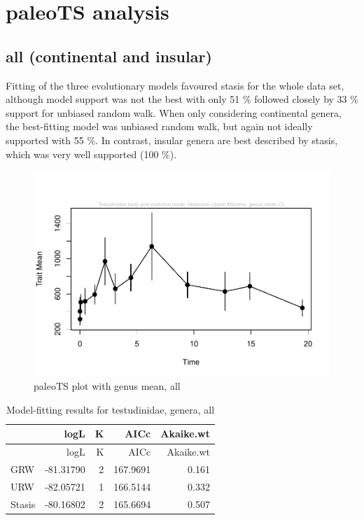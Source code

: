 \FloatBarrier

\section{paleoTS analysis}\label{paleots-analysis}




\subsection{all (continental and
	insular)}\label{all-continental-and-insular}

Fitting of the three evolutionary models favoured stasis for the whole data set, although model support was not the best with only 51 \% followed closely by 33 \% support for unbiased random walk. When only considering continental genera, the best-fitting model was unbiased random walk, but again not ideally supported with 55 \%. In contrast, insular genera are best described by stasis, which was very well supported (100 \%). 


\begin{figure}[H]
	\centering
	\includegraphics{MA_JJ_files/figure-latex/paleoTSAll-1.pdf}
	\caption{paleoTS plot with genus mean, all}
	\label{fig:pTSall}
\end{figure}

\begin{longtable}[]{@{}lrrrr@{}}
	\caption{Model-fitting results for testudinidae, genera,
		all}
	\label{tab:pTSallEM}\tabularnewline
	\toprule
	& logL & K & AICc & Akaike.wt\tabularnewline
	\midrule
	\endfirsthead
	\toprule
	& logL & K & AICc & Akaike.wt\tabularnewline
	\midrule
	\endhead
	GRW & -81.31790 & 2 & 167.9691 & 0.161\tabularnewline
	URW & -82.05721 & 1 & 166.5144 & 0.332\tabularnewline
	Stasis & -80.16802 & 2 & 165.6694 & 0.507\tabularnewline
	\bottomrule
\end{longtable}

